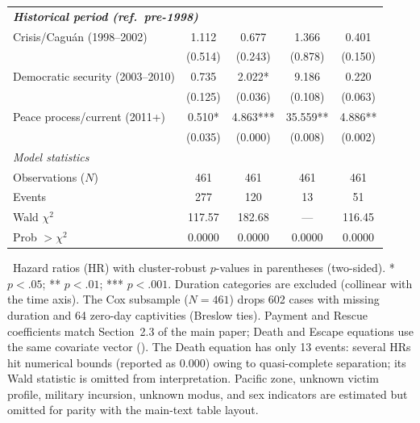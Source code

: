 {\begin{longtable}{lcccc}
\multicolumn{5}{l}{\textbf{\textit{Historical period (ref.\ pre-1998)}}} \\
Crisis/Cagu\'an (1998--2002) & 1.112 & 0.677 & 1.366 & 0.401 \\
                             & {\scriptsize (0.514)} & {\scriptsize (0.243)} & {\scriptsize (0.878)} & {\scriptsize (0.150)} \\
Democratic security (2003--2010) & 0.735 & 2.022* & 9.186 & 0.220 \\
                                 & {\scriptsize (0.125)} & {\scriptsize (0.036)} & {\scriptsize (0.108)} & {\scriptsize (0.063)} \\
Peace process/current (2011+) & 0.510* & 4.863*** & 35.559** & 4.886** \\
                              & {\scriptsize (0.035)} & {\scriptsize (0.000)} & {\scriptsize (0.008)} & {\scriptsize (0.002)} \\
\midrule

\multicolumn{5}{l}{\textit{Model statistics}} \\
Observations ($N$) & 461 & 461 & 461 & 461 \\
Events & 277 & 120 & 13 & 51 \\
Wald $\chi^2$ & 117.57 & 182.68 & --- & 116.45 \\
Prob $>\chi^2$ & 0.0000 & 0.0000 & 0.0000 & 0.0000 \\
\end{longtable}
}
\tabnote\ Hazard ratios (HR) with cluster-robust $p$-values in parentheses
(two-sided). * $p<.05$; ** $p<.01$; *** $p<.001$. Duration categories are
excluded (collinear with the time axis). The Cox subsample ($N=461$) drops
602 cases with missing duration and 64 zero-day captivities (Breslow ties).
Payment and Rescue coefficients match Section~2.3 of the main paper; Death
and Escape equations use the same covariate vector (). The
Death equation has only 13 events: several HRs hit numerical bounds (reported
as 0.000) owing to quasi-complete separation; its Wald statistic is omitted
from interpretation. Pacific zone, unknown victim profile, military
incursion, unknown modus, and sex indicators are estimated but omitted for
parity with the main-text table layout.
\tabsource
